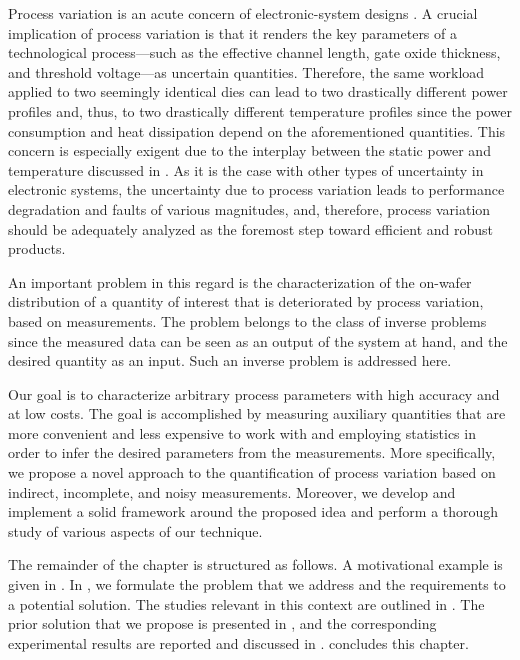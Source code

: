 Process variation is an acute concern of electronic-system designs
\cite{chandrakasan2000, srivastava2010}. A crucial implication of process
variation is that it renders the key parameters of a technological
process---such as the effective channel length, gate oxide thickness, and
threshold voltage---as uncertain quantities. Therefore, the same workload
applied to two seemingly identical dies can lead to two drastically different
power profiles and, thus, to two drastically different temperature profiles
since the power consumption and heat dissipation depend on the aforementioned
quantities. This concern is especially exigent due to the interplay between the
static power and temperature \cite{liu2007, srivastava2010} discussed in
. As it is the case with other types of uncertainty in
electronic systems, the uncertainty due to process variation leads to
performance degradation and faults of various magnitudes, and, therefore,
process variation should be adequately analyzed as the foremost step toward
efficient and robust products.

An important problem in this regard is the characterization of the on-wafer
distribution of a quantity of interest that is deteriorated by process
variation, based on measurements. The problem belongs to the class of inverse
problems since the measured data can be seen as an output of the system at hand,
and the desired quantity as an input. Such an inverse problem is addressed here.

Our goal is to characterize arbitrary process parameters with high accuracy and
at low costs. The goal is accomplished by measuring auxiliary quantities that
are more convenient and less expensive to work with and employing statistics in
order to infer the desired parameters from the measurements. More specifically,
we propose a novel approach to the quantification of process variation based on
indirect, incomplete, and noisy measurements. Moreover, we develop and implement
a solid framework around the proposed idea and perform a thorough study of
various aspects of our technique.

The remainder of the chapter is structured as follows. A motivational example is
given in . In , we formulate the
problem that we address and the requirements to a potential solution. The
studies relevant in this context are outlined in . The
prior solution that we propose is presented in , and
the corresponding experimental results are reported and discussed in
.  concludes this chapter.


